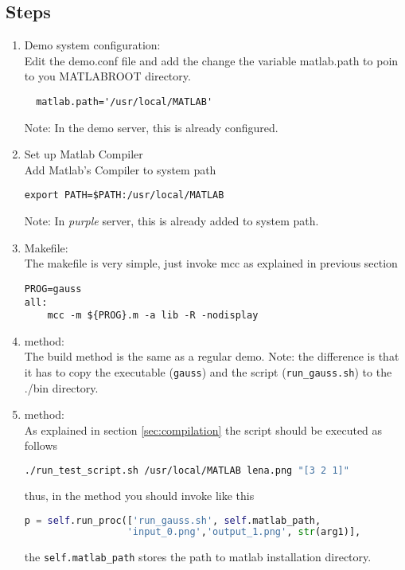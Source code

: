 \subsection{Steps}
\begin{enumerate}
 
  \item Demo system configuration:\\
  Edit the demo.conf file and add the change the variable matlab.path to poin to you MATLABROOT directory.
  \begin{lstlisting}
  matlab.path='/usr/local/MATLAB'
  \end{lstlisting}
  Note: In the demo server, this is already configured.
  
 \item Set up Matlab Compiler\\
 Add Matlab's Compiler to system path
\begin{lstlisting}
export PATH=$PATH:/usr/local/MATLAB
\end{lstlisting}
Note: In \emph{purple} server, this is already added to system path.

\item Makefile:\\
The makefile is very simple, just invoke mcc as explained in previous section
\begin{lstlisting}
PROG=gauss
all:
	mcc -m ${PROG}.m -a lib -R -nodisplay
\end{lstlisting}

\item {} method:\\
The build method is the same as a regular demo. Note: the difference is that it has to copy the executable (\verb+gauss+) and the script (\verb+run_gauss.sh+) to the ./bin directory.

\item {} method: \\
As explained in section \ref{sec:compilation} the script should be executed as follows
\begin{lstlisting}[language=bash]
./run_test_script.sh /usr/local/MATLAB lena.png "[3 2 1]" 
\end{lstlisting}
thus, in the  method you should invoke  like this
\begin{lstlisting}[language=python]
p = self.run_proc(['run_gauss.sh', self.matlab_path, 
			      'input_0.png','output_1.png', str(arg1)],
\end{lstlisting}
the \verb+self.matlab_path+ stores the path to matlab installation directory.

\end{enumerate}


